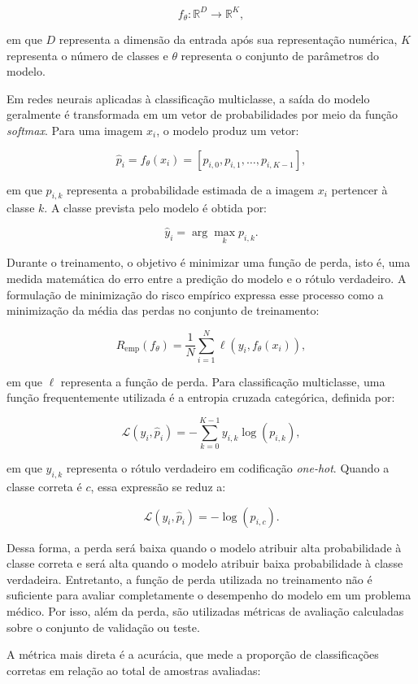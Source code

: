 \documentclass[
    12pt,
    openright,
    oneside,
    a4paper,
    english,
    brazil
]{abntex2}
\begin{document}
\[
f_{\theta}: \mathbb{R}^{D} \rightarrow \mathbb{R}^{K},
\]

em que \(D\) representa a dimensão da entrada após sua representação numérica, \(K\) representa o número de classes e \(\theta\) representa o conjunto de parâmetros do modelo.

Em redes neurais aplicadas à classificação multiclasse, a saída do modelo geralmente é transformada em um vetor de probabilidades por meio da função \textit{softmax}. Para uma imagem \(x_i\), o modelo produz um vetor:

\[
\hat{p}_i = f_{\theta}(x_i) = [p_{i,0}, p_{i,1}, \ldots, p_{i,K-1}],
\]

em que \(p_{i,k}\) representa a probabilidade estimada de a imagem \(x_i\) pertencer à classe \(k\). A classe prevista pelo modelo é obtida por:

\[
\hat{y}_i = \arg\max_{k} p_{i,k}.
\]

Durante o treinamento, o objetivo é minimizar uma função de perda, isto é, uma medida matemática do erro entre a predição do modelo e o rótulo verdadeiro. A formulação de minimização do risco empírico expressa esse processo como a minimização da média das perdas no conjunto de treinamento:

\[
R_{\text{emp}}(f_{\theta}) =
\frac{1}{N}
\sum_{i=1}^{N}
\ell(y_i, f_{\theta}(x_i)),
\]

em que \(\ell\) representa a função de perda. Para classificação multiclasse, uma função frequentemente utilizada é a entropia cruzada categórica, definida por:

\[
\mathcal{L}(y_i, \hat{p}_i) =
-\sum_{k=0}^{K-1} y_{i,k}\log(p_{i,k}),
\]

em que \(y_{i,k}\) representa o rótulo verdadeiro em codificação \textit{one-hot}. Quando a classe correta é \(c\), essa expressão se reduz a:

\[
\mathcal{L}(y_i, \hat{p}_i) = -\log(p_{i,c}).
\]

Dessa forma, a perda será baixa quando o modelo atribuir alta probabilidade à classe correta e será alta quando o modelo atribuir baixa probabilidade à classe verdadeira. Entretanto, a função de perda utilizada no treinamento não é suficiente para avaliar completamente o desempenho do modelo em um problema médico. Por isso, além da perda, são utilizadas métricas de avaliação calculadas sobre o conjunto de validação ou teste.

A métrica mais direta é a acurácia, que mede a proporção de classificações corretas em relação ao total de amostras avaliadas:
\end{document}
